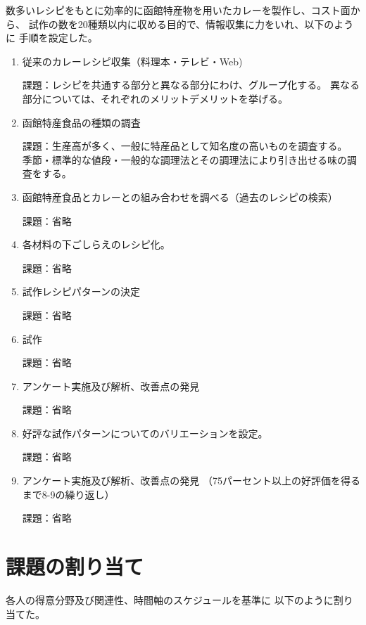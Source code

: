 数多いレシピをもとに効率的に函館特産物を用いたカレーを製作し、コスト面から、 
試作の数を20種類以内に収める目的で、情報収集に力をいれ、以下のように 
手順を設定した。

\begin{enumerate}
\item 従来のカレーレシピ収集（料理本・テレビ・Web)
\par 課題：レシピを共通する部分と異なる部分にわけ、グループ化する。
異なる部分については、それぞれのメリットデメリットを挙げる。

\item 函館特産食品の種類の調査
\par 課題：生産高が多く、一般に特産品として知名度の高いものを調査する。
季節・標準的な値段・一般的な調理法とその調理法により引き出せる味の調査をする。

\item 函館特産食品とカレーとの組み合わせを調べる（過去のレシピの検索）
\par 課題：省略

\item 各材料の下ごしらえのレシピ化。
\par 課題：省略

\item 試作レシピパターンの決定
\par 課題：省略

\item 試作
\par 課題：省略

\item アンケート実施及び解析、改善点の発見
\par 課題：省略

\item 好評な試作パターンについてのバリエーションを設定。
\par 課題：省略

\item アンケート実施及び解析、改善点の発見
（75パーセント以上の好評価を得るまで8-9の繰り返し）
\par 課題：省略
\end{enumerate}


\section{課題の割り当て}

各人の得意分野及び関連性、時間軸のスケジュールを基準に
以下のように割り当てた。
